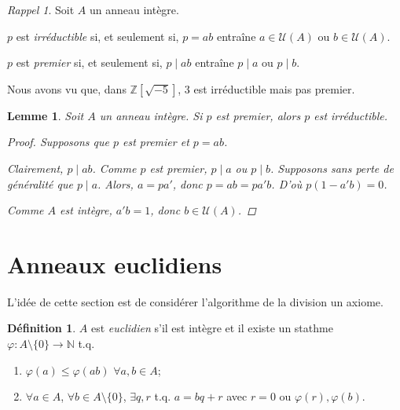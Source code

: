 \documentclass{report}
\newtheorem*{lem}{Lemme}
\theoremstyle{definition}
\newtheorem*{dfn}{D\'efinition}
\theoremstyle{remark}
\newtheorem*{rapp}{Rappel}
\def\lte{\leqslant}
\def\NN{\mathbb{N}}
\def\ZZ{\mathbb{Z}}
\begin{document}
	\begin{rapp}
		Soit $A$ un anneau int\`egre.

		$p$ est \emph{irr\'eductible} si, et seulement si, $p=ab$ entra\^ine $a\in\mathcal{U}(A)$ ou $b\in\mathcal{U}(A)$.

		$p$ est \emph{premier} si, et seulement si, $p \mid ab$ entra\^ine $p \mid a$ ou $p \mid b$.

		Nous avons vu que, dans $\ZZ[\sqrt{-5}]$, $3$ est irr\'eductible mais pas premier.
	\end{rapp}

	\begin{lem}
		Soit $A$ un anneau int\`egre. Si $p$ est premier, alors $p$ est irr\'eductible.
		\begin{proof}
			Supposons que $p$ est premier et $p=ab$.

			Clairement, $p \mid ab$. Comme $p$ est premier, $p \mid a$ ou $p \mid b$. Supposons sans perte de g\'en\'eralit\'e que $p \mid a$. Alors, $a=pa'$, donc $p=ab=pa'b$. D'o\`u $p(1-a'b)=0$.

			Comme $A$ est int\`egre, $a'b=1$, donc $b\in\mathcal{U}(A)$.
		\end{proof}
	\end{lem}

	\section{Anneaux euclidiens}
	L'id\'ee de cette section est de consid\'erer l'algorithme de la division un axiome.

	\begin{dfn}
		$A$ est \emph{euclidien} s'il est int\`egre et il existe un stathme $\varphi:A\setminus\{0\}\to\NN$ t.q.
		\begin{enumerate}
			\item $\varphi(a)\lte\varphi(ab)$ $\forall a,b\in A$;
			\item $\forall a\in A$, $\forall b\in A\setminus\{0\}$, $\exists q,r$ t.q. $a=bq+r$ avec $r=0$ ou $\varphi(r),\varphi(b)$.
		\end{enumerate}
	\end{dfn}
\end{document}
